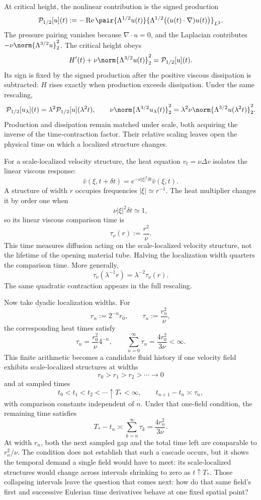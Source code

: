 
At critical height, the nonlinear contribution is the signed production
\[
  \mathcal P_{1/2}[u](t)
  :=
  -\operatorname{Re}
  \pair
    {\Lambda^{1/2}u(t)}
    {\Lambda^{1/2}\bigl((u(t)\cdot\nabla)u(t)\bigr)}_{L^2}.
\]
The pressure pairing vanishes because \(\nabla\cdot u=0\), and the Laplacian contributes \(-\nu\norm{\Lambda^{3/2}u}_2^2\).
The critical height obeys
\[
  H'(t)
  +
  \nu\norm{\Lambda^{3/2}u(t)}_2^2
  =
  \mathcal P_{1/2}[u](t).
\]
Its sign is fixed by the signed production after the positive viscous dissipation is subtracted: \(H\) rises exactly when production exceeds dissipation.
Under the same rescaling,
\[
  \mathcal P_{1/2}[u_\lambda](t)
  =
  \lambda^2\mathcal P_{1/2}[u](\lambda^2t),
  \qquad
  \nu\norm{\Lambda^{3/2}u_\lambda(t)}_2^2
  =
  \lambda^2\nu\norm{\Lambda^{3/2}u(\lambda^2t)}_2^2.
\]
Production and dissipation remain matched under scale, both acquiring the inverse of the time-contraction factor.
Their relative scaling leaves open the physical time on which a localized structure changes.


For a scale-localized velocity structure, the heat equation \(v_t=\nu\Delta v\) isolates the linear viscous response:
\[
  \widehat v(\xi,t+\delta t)
  =
  e^{-\nu|\xi|^2\delta t}\widehat v(\xi,t).
\]
A structure of width \(r\) occupies frequencies \(|\xi|\simeq r^{-1}\).
The heat multiplier changes it by order one when
\[
  \nu|\xi|^2\delta t\simeq1,
\]
so its linear viscous comparison time is
\[
  \tau_\nu(r)
  :=
  \frac{r^2}{\nu}.
\]
This time measures diffusion acting on the scale-localized velocity structure, not the lifetime of the opening material tube.
Halving the localization width quarters the comparison time.
More generally,
\[
  \tau_\nu(\lambda^{-1}r)
  =
  \lambda^{-2}\tau_\nu(r).
\]
The same quadratic contraction appears in the full \NavierStokes{} rescaling.


Now take dyadic localization widths.
For
\[
  r_n:=2^{-n}r_0,
  \qquad
  \tau_n:=\frac{r_n^2}{\nu},
\]
the corresponding heat times satisfy
\[
  \tau_n
  =
  \frac{r_0^2}{\nu}4^{-n},
  \qquad
  \sum_{n=0}^{\infty}\tau_n
  =
  \frac{4r_0^2}{3\nu}
  <
  \infty.
\]
This finite arithmetic becomes a candidate fluid history if one \NavierStokes{} velocity field exhibits scale-localized structures at widths
\[
  r_0>r_1>r_2>\cdots\longrightarrow0
\]
and at sampled times
\[
  t_0<t_1<t_2<\cdots\uparrow T_*<\infty,
  \qquad
  t_{n+1}-t_n\asymp\tau_n,
\]
with comparison constants independent of \(n\).
Under that one-field condition, the remaining time satisfies
\[
  T_*-t_n
  \asymp
  \sum_{k=n}^{\infty}\tau_k
  =
  \frac{4r_n^2}{3\nu}.
\]
At width \(r_n\), both the next sampled gap and the total time left are comparable to \(r_n^2/\nu\).
The condition does not establish that such a cascade occurs, but it shows the temporal demand a single field would have to meet: its scale-localized structures would change across intervals shrinking to zero as \(t\uparrow T_*\).
Those collapsing intervals leave the question that comes next: how do that same field's first and successive Eulerian time derivatives behave at one fixed spatial point?
